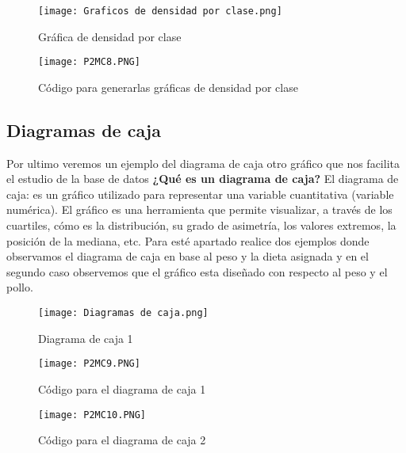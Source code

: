 \documentclass{article}
\begin{document}
\begin{figure}[h]
    \centering
    \texttt{[image: Graficos de densidad por clase.png]}
    \caption{Gráfica de densidad por clase }
    \label{fig:mesh10}
\end{figure}

\begin{figure}[h]
    \centering
    \texttt{[image: P2MC8.PNG]}
    \caption{Código para generarlas gráficas de densidad por clase  }
    \label{fig:mesh11}
\end{figure}

\subsection{Diagramas de caja}
Por ultimo veremos un ejemplo del diagrama de caja otro gráfico que nos facilita el estudio de la base de datos
\newline
{}
\textbf{¿Qué es un diagrama de caja?}
\newline
El diagrama de caja: es un gráfico utilizado para representar una variable cuantitativa (variable numérica). El gráfico es una herramienta que permite visualizar, a través de los cuartiles, cómo es la distribución, su grado de asimetría, los valores extremos, la posición de la mediana, etc.
\newline
\newline
Para esté apartado realice dos ejemplos donde observamos el diagrama de caja en base al peso y la dieta asignada y en el segundo caso observemos que el gráfico esta diseñado con respecto al peso y el pollo.


\newpage
\begin{figure}[h]
    \centering
    \texttt{[image: Diagramas de caja.png]}
    \caption{Diagrama de caja 1}
    \label{fig:mesh12}
\end{figure}

\begin{figure}[h]
    \centering
    \texttt{[image: P2MC9.PNG]}
    \caption{Código para el diagrama de caja 1  }
    \label{fig:mesh13}
\end{figure}

\begin{figure}[h]
    \centering
    \texttt{[image: P2MC10.PNG]}
    \caption{Código para el diagrama de caja 2  }
    \label{fig:mesh14}
\end{figure}
\end{document}
